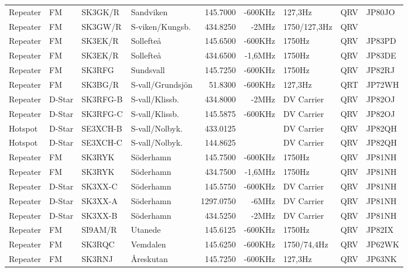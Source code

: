 \begin{longtable}{llllrrlcl}
Repeater & FM     & SK3GK/R  & Sandviken        & 145.7000  & -600KHz  & 127,3Hz       & QRV & JP80JO \\
Repeater & FM     & SK3GW/R  & S-viken/Kungsb.  & 434.8250  & -2MHz    & 1750/127,3Hz  & QRV &        \\
Repeater & FM     & SK3EK/R  & Sollefteå        & 145.6500  & -600KHz  & 1750Hz        & QRV & JP83PD \\
Repeater & FM     & SK3EK/R  & Sollefteå        & 434.6500  & -1,6MHz  & 1750Hz        & QRV & JP83DE \\
Repeater & FM     & SK3RFG   & Sundsvall        & 145.7250  & -600KHz  & 1750Hz        & QRV & JP82RJ \\
Repeater & FM     & SK3BG/R  & S-vall/Grundsjön & 51.8300   & -600KHz  & 127,3Hz       & QRT & JP72WH \\
Repeater & D-Star & SK3RFG-B & S-vall/Klissb.   & 434.8000  & -2MHz    & DV Carrier    & QRV & JP82OJ \\
Repeater & D-Star & SK3RFG-C & S-vall/Klissb.   & 145.5875  & -600KHz  & DV Carrier    & QRV & JP82OJ \\
Hotspot  & D-Star & SE3XCH-B & S-vall/Nolbyk.   & 433.0125  &          & DV Carrier    & QRV & JP82QH \\
Hotspot  & D-Star & SE3XCH-C & S-vall/Nolbyk.   & 144.8625  &          & DV Carrier    & QRV & JP82QH \\
Repeater & FM     & SK3RYK   & Söderhamn        & 145.7500  & -600KHz  & 1750Hz        & QRV & JP81NH \\
Repeater & FM     & SK3RYK   & Söderhamn        & 434.7500  & -1,6MHz  & 1750Hz        & QRV & JP81NH \\
Repeater & D-Star & SK3XX-C  & Söderhamn        & 145.5750  & -600KHz  & DV Carrier    & QRV & JP81NH \\
Repeater & D-Star & SK3XX-A  & Söderhamn        & 1297.0750 & -6MHz    & DV Carrier    & QRV & JP81NH \\
Repeater & D-Star & SK3XX-B  & Söderhamn        & 434.5250  & -2MHz    & DV Carrier    & QRV & JP81NH \\
Repeater & FM     & SI9AM/R  & Utanede          & 145.6125  & -600KHz  & 1750Hz        & QRV & JP82IX \\
Repeater & FM     & SK3RQC   & Vemdalen         & 145.6250  & -600KHz  & 1750/74,4Hz   & QRV & JP62WK \\
Repeater & FM     & SK3RNJ   & Åreskutan        & 145.7250  & -600KHz  & 127,3Hz       & QRV & JP63NK \\

\end{longtable}
